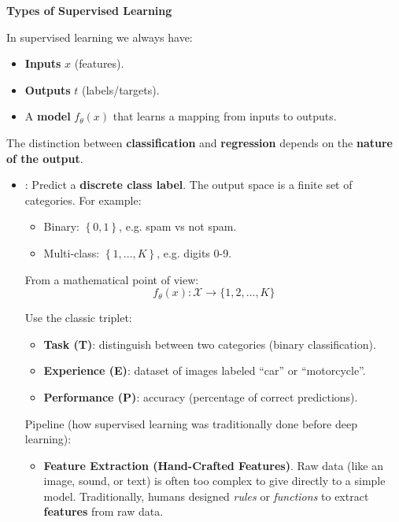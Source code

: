 \highspace
\begin{flushleft}
    \textcolor{Green3}{ \textbf{Types of Supervised Learning}}
\end{flushleft}
In supervised learning we always have:
\begin{itemize}
    \item \textbf{Inputs} $x$ (features).
    \item \textbf{Outputs} $t$ (labels/targets).
    \item A \textbf{model} $f_{\theta}(x)$ that learns a mapping from inputs to outputs.
\end{itemize}
The distinction between \textbf{classification} and \textbf{regression} depends on the \textbf{nature of the output}.
\begin{itemize}
    \item {}: Predict a \textbf{discrete class label}. The output space is a finite set of categories. For example:
    \begin{itemize}
        \item Binary: $\left\{0, 1\right\}$, e.g. spam vs not spam.
        \item Multi-class: $\left\{1, \dots, K\right\}$, e.g. digits 0-9.
    \end{itemize}
    From a mathematical point of view:
    \begin{equation*}
        f_\theta(x) : \mathcal{X} \to \{1, 2, \dots, K\}
    \end{equation*}
    \begin{examplebox}
        Use the classic triplet:
        \begin{itemize}
            \item \textbf{Task (T)}: distinguish between two categories (binary classification).
            \item \textbf{Experience (E)}: dataset of images labeled ``car'' or ``motorcycle''.
            \item \textbf{Performance (P)}: accuracy (percentage of correct predictions).
        \end{itemize}
        Pipeline (how supervised learning was traditionally done before deep learning):
        \begin{itemize}
            \item \textbf{Feature Extraction (Hand-Crafted Features)}. Raw data (like an image, sound, or text) is often too complex to give directly to a simple model. Traditionally, humans designed \emph{rules} or \emph{functions} to extract \textbf{features} from raw data.

\end{itemize}
\end{examplebox}
\end{itemize}
